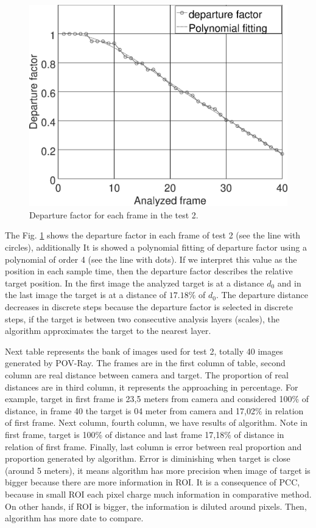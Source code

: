 \begin{figure}[H]
\includegraphics[width=\columnwidth]{images/grapha_b.eps}
\caption{Departure factor for each frame in the test 2.}
\label{fig:res_grapha_b}
\end{figure}

The Fig. \ref{fig:res_grapha_b} shows the departure factor in each frame
of test 2 (see the line with circles), additionally It is showed a polynomial
fitting of departure factor using a polynomial of order 4 (see the line with dots). 
If we interpret this value as the position in each sample time, 
then the departure factor describes the relative target position.
In the first image the analyzed target is at a distance $d_0$ 
and in the last image the target is at a distance of $17.18\%$ of $d_0$.
The departure distance decreases in discrete steps because the departure
factor is selected in discrete steps, if the target is
between two consecutive analysis layers (scales), the algorithm
approximates the target to the nearest layer.



Next table represents the bank of images used for test 2, totally 40 images generated by POV-Ray.
The frames are in the first column of table, second column are real distance between camera and target.
The proportion of real distances are in third column, it represents the approaching in percentage. For example, 
target in first frame is 23,5 meters from camera and considered 100\% of distance, in frame 40 the target is 04 meter 
from camera and 17,02\% in relation of first frame. Next column, fourth column, we have results of algorithm. 
Note in first frame, target is 100\% of distance and last frame 17,18\% of distance in relation of first frame.
Finally, last column is error between real proportion and proportion generated by algorithm. 
Error is diminishing when target is close (around 5 meters), it means algorithm has more precision 
when image of target is bigger because there are more information in ROI. It is a consequence of PCC, 
because in small ROI each pixel charge much information in comparative method. On other hands, if ROI is bigger,
the information is diluted around pixels. Then, algorithm has more date to compare.

